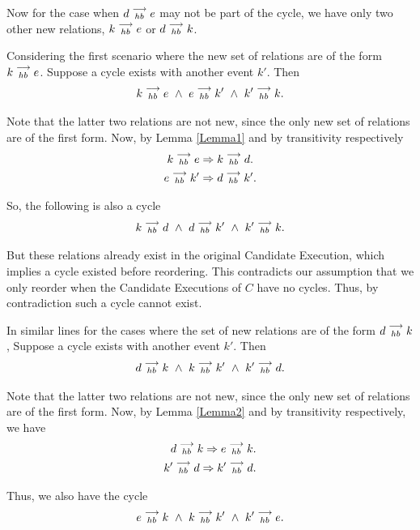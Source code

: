     Now for the case when $d\stackrel{\longrightarrow}{_{hb}}e$ may not be part of the cycle, we have only two other new relations, $k\stackrel{\longrightarrow}{_{hb}}e$ or $d\stackrel{\longrightarrow}{_{hb}}k$.

    Considering the first scenario where the new set of relations are of the form $k\stackrel{\longrightarrow}{_{hb}}e$. 
    Suppose a cycle exists with another event $k'$. Then 
    \[
        k\stackrel{\longrightarrow}{_{hb}}e \ \wedge \
        e\stackrel{\longrightarrow}{_{hb}}k' \ \wedge \
        k'\stackrel{\longrightarrow}{_{hb}}k.
    \]

    Note that the latter two relations are not new, since the only new set of relations are of the first form. Now, by Lemma \ref{Lemma1} and by transitivity respectively
    \begin{gather*}
        k\stackrel{\longrightarrow}{_{hb}}e \Rightarrow k\stackrel{\longrightarrow}{_{hb}}d. \\
        e\stackrel{\longrightarrow}{_{hb}}k' \Rightarrow d\stackrel{\longrightarrow}{_{hb}}k'.    
    \end{gather*}

    So, the following is also a cycle
    \[
        k\stackrel{\longrightarrow}{_{hb}}d \ \wedge \
        d\stackrel{\longrightarrow}{_{hb}}k' \ \wedge \
        k'\stackrel{\longrightarrow}{_{hb}}k.
    \]

    But these relations already exist in the original Candidate Execution, which implies a cycle existed before reordering. 
    This contradicts our assumption that we only reorder when the Candidate Executions of $C$ have no cycles. 
    Thus, by contradiction such a cycle cannot exist.

    In similar lines for the cases where the set of new relations are of the form $d\stackrel{\longrightarrow}{_{hb}}k$,  Suppose a cycle exists with another event $k'$. Then 
    \begin{align*}
        \reln{d}{hb}{k} \ \wedge \
        \reln{k}{hb}{k'} \ \wedge \ 
        \reln{k'}{hb}{d}. 
    \end{align*}

    Note that the latter two relations are not new, since the only new set of relations are of the first form. 
    Now, by Lemma \ref{Lemma2} and by transitivity respectively, we have 
    \begin{align*}
        d\stackrel{\longrightarrow}{_{hb}}k \Rightarrow e\stackrel{\longrightarrow}{_{hb}}k. \\
        k'\stackrel{\longrightarrow}{_{hb}}d \Rightarrow k'\stackrel{\longrightarrow}{_{hb}}d.
    \end{align*}

    Thus, we also have the cycle 
    \begin{align*}
        \reln{e}{hb}{k} \ \wedge \
        \reln{k}{hb}{k'} \ \wedge \ 
        \reln{k'}{hb}{e}. 
    \end{align*}

